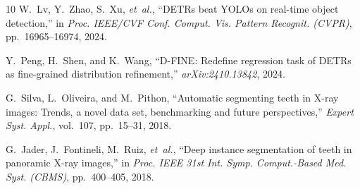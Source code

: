 \documentclass[10pt,journal,compsoc]{IEEEtran}
\begin{document}
\begin{thebibliography}{10}
W.~Lv, Y.~Zhao, S.~Xu, \textit{et~al.}, ``DETRs beat YOLOs on real-time object detection,'' in \textit{Proc. IEEE/CVF Conf. Comput. Vis. Pattern Recognit. (CVPR)}, pp.~16965--16974, 2024.

Y.~Peng, H.~Shen, and K.~Wang, ``D-FINE: Redefine regression task of DETRs as fine-grained distribution refinement,'' \textit{arXiv:2410.13842}, 2024.

G.~Silva, L.~Oliveira, and M.~Pithon, ``Automatic segmenting teeth in X-ray images: Trends, a novel data set, benchmarking and future perspectives,'' \textit{Expert Syst. Appl.}, vol.~107, pp.~15--31, 2018.

G.~Jader, J.~Fontineli, M.~Ruiz, \textit{et~al.}, ``Deep instance segmentation of teeth in panoramic X-ray images,'' in \textit{Proc. IEEE 31st Int. Symp. Comput.-Based Med. Syst. (CBMS)}, pp.~400--405, 2018.
\end{thebibliography}
\end{document}
